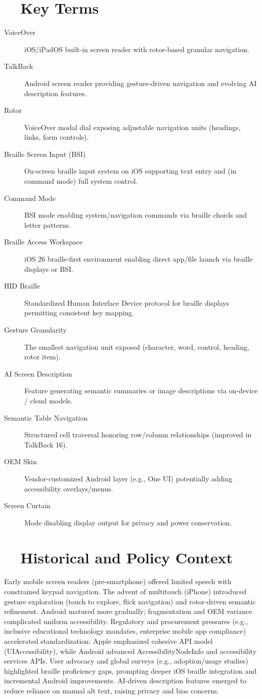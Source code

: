 \section{~~Key Terms}
\label{sec:sr26-key-terms}
\begin{description}
	\item[VoiceOver] iOS/iPadOS built-in screen reader with rotor-based granular navigation.
	\item[TalkBack] Android screen reader providing gesture-driven navigation and evolving AI description features.
	\item[Rotor] VoiceOver modal dial exposing adjustable navigation units (headings, links, form controls).
	\item[Braille Screen Input (BSI)] On-screen braille input system on iOS supporting text entry and (in command mode) full system control.
	\item[Command Mode] BSI mode enabling system/navigation commands via braille chords and letter patterns.
	\item[Braille Access Workspace] iOS 26 braille-first environment enabling direct app/file launch via braille displays or BSI.
	\item[HID Braille] Standardized Human Interface Device protocol for braille displays permitting consistent key mapping.
	\item[Gesture Granularity] The smallest navigation unit exposed (character, word, control, heading, rotor item).
	\item[AI Screen Description] Feature generating semantic summaries or image descriptions via on-device / cloud models.
	\item[Semantic Table Navigation] Structured cell traversal honoring row/column relationships (improved in TalkBack 16).
	\item[OEM Skin] Vendor-customized Android layer (e.g., One UI) potentially adding accessibility overlays/menus.
	\item[Screen Curtain] Mode disabling display output for privacy and power conservation.
\end{description}

\section{~~Historical and Policy Context}
\label{sec:sr26-history}
Early mobile screen readers (pre-smartphone) offered limited speech with constrained keypad navigation. The advent of multitouch (iPhone) introduced gesture exploration (touch to explore, flick navigation) and rotor-driven semantic refinement. Android matured more gradually; fragmentation and OEM variance complicated uniform accessibility. Regulatory and procurement pressures (e.g., inclusive educational technology mandates, enterprise mobile app compliance) accelerated standardization: Apple emphasized cohesive API model (UIAccessibility), while Android advanced AccessibilityNodeInfo and accessibility services APIs. User advocacy and global surveys (e.g., adoption/usage studies) highlighted braille proficiency gaps, prompting deeper iOS braille integration and incremental Android improvements. AI-driven description features emerged to reduce reliance on manual alt text, raising privacy and bias concerns.


